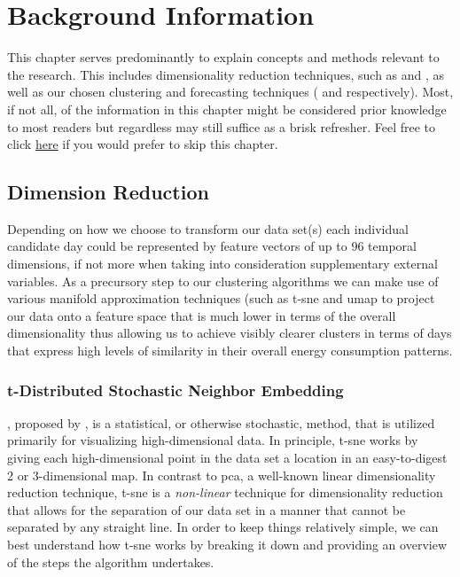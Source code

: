 \chapter{Background Information}
\label{ch:Background-Information}
This chapter serves predominantly to explain concepts and methods relevant to the research. This includes dimensionality reduction techniques, such as  and , as well as our chosen clustering and forecasting techniques ( and  respectively). Most, if not all, of the information in this chapter might be considered prior knowledge to most readers but regardless may still suffice as a brisk refresher. Feel free to click \hyperref[ch:Exploratory-Data-Analysis]{here} if you would prefer to skip this chapter.

\section{Dimension Reduction}
\label{sec:Background-Information:Dimension-Reduction}
Depending on how we choose to transform our data set(s) each individual candidate day could be represented by feature vectors of up to 96 temporal dimensions, if not more when taking into consideration supplementary external variables. As a precursory step to our clustering algorithms we can make use of various manifold approximation techniques (such as \gls{t-sne} and \gls{umap} to project our data onto a feature space that is much lower in terms of the overall dimensionality thus allowing us to achieve visibly clearer clusters in terms of days that express high levels of similarity in their overall energy consumption patterns.

\subsection{t-Distributed Stochastic Neighbor Embedding}
\label{subsec:Background-Information:Dimension-Reduction:t-Distributed-Stochastic-Neighbor-Embedding}
, proposed by \citet{Laurens}, is a statistical, or otherwise stochastic, method, that is utilized primarily for visualizing high-dimensional data. In principle, \gls{t-sne} works by giving each high-dimensional point in the data set a location in an easy-to-digest 2 or 3-dimensional map. In contrast to \gls{pca}, a well-known linear dimensionality reduction technique, \gls{t-sne} is a \textit{non-linear} technique for dimensionality reduction that allows for the separation of our data set in a manner that cannot be separated by any straight line. In order to keep things relatively simple, we can best understand how \gls{t-sne} works by breaking it down and providing an overview of the steps the algorithm undertakes.

